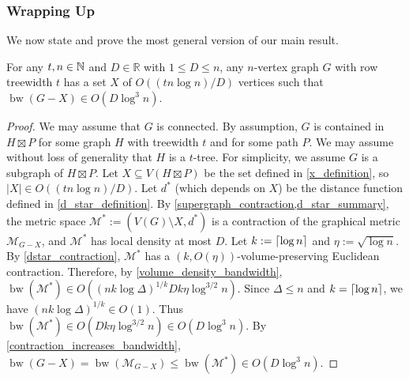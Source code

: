 \documentclass{patmorin}
\renewcommand{\le}{\leqslant}
\renewcommand{\leq}{\leqslant}
\DeclareMathOperator{\bw}{bw}
\begin{document}


\subsubsection{Wrapping Up}

We now state and prove the most general version of our main result.

\begin{thm}
\label{main_thm_products_D}
For any $t,n\in\mathbb{N}$ and $D\in\mathbb{R}$ with $1\leq D\leq n$, any $n$-vertex graph $G$ with row treewidth $t$ has a set $X$ of $O((tn\log n)/D)$ vertices such that $\bw(G-X)\in O(D\log^3 n)$.
\end{thm}

\begin{proof}
We may assume that $G$ is connected.
By assumption, $G$ is contained in $H\boxtimes P$ for some graph $H$ with treewidth $t$ and for some path $P$.
We may assume without loss of generality that $H$ is a $t$-tree. For simplicity, we assume $G$ is a subgraph of $H\boxtimes P$. Let $X\subseteq V(H\boxtimes P)$ be the set defined in \cref{x_definition}, so $|X|\in O((tn\log n)/D)$. Let $d^*$ (which depends on $X$) be the distance function defined in \cref{d_star_definition}.  By \cref{supergraph_contraction,d_star_summary}, the metric space $\mathcal{M}^*:=(V(G)\setminus X,d^*)$ is a contraction of the graphical metric $\mathcal{M}_{G-X}$, and
$\mathcal{M}^*$ has local density at most $D$. Let $k:={\lceil \log n \rceil}$ and $\eta:=\sqrt{\log n}$.
By \cref{dstar_contraction}, $\mathcal{M}^*$ has a $(k,O(\eta))$-volume-preserving Euclidean contraction.  Therefore, by \cref{volume_density_bandwidth}, $\bw(\mathcal{M}^*)\in
O( (nk\log\Delta)^{1/k} Dk\eta \log^{3/2} n)$.
Since $\Delta\leq n$ and $k={\lceil \log n \rceil}$, we have
$(nk\log\Delta)^{1/k}\in O(1)$.
Thus
$\bw(\mathcal{M}^*)\in O(  Dk\eta \log^{3/2} n) \in O(D\log^3 n)$.
By \cref{contraction_increases_bandwidth}, $\bw(G-X) =\bw(\mathcal{M}_{G-X})\le \bw(\mathcal{M}^*) \in
O(D\log^3 n)$.
\end{proof}
\end{document}
